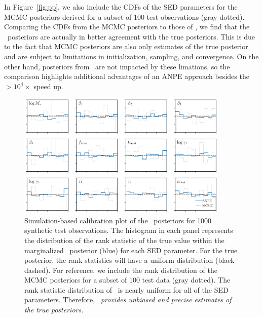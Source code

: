 In Figure~\ref{fig:pp}, we also include the CDFs of the SED parameters for the
MCMC posteriors derived for a subset of 100 test observations (gray dotted). 
Comparing the CDFs from the MCMC posteriors to those of \sedflow, we find that
the \sedflow~posteriors are actually in better agreement with the true
posteriors. 
This is due to the fact that MCMC posteriors are also only estimates of the
true posterior and are subject to limitations in initialization, sampling, and
convergence.
On the other hand, posteriors from \sedflow~are not impacted by these
limations, so the comparison highlights additional advantages of an ANPE
approach besides the ${>}10^4\times$ speed up.

\begin{figure}
\begin{center}
    \includegraphics[width=0.9\textwidth]{figs/sbc.pdf}
    \caption{\label{fig:sbc}
    Simulation-based calibration plot of the \sedflow~posteriors for 1000
    synthetic test observations. 
    The histogram in each panel represents the distribution of the rank
    statistic of the true value within the marginalized \sedflow~posterior
    (blue) for each SED parameter.
    For the true posterior, the rank statistics will have a uniform
    distribution (black dashed). 
    For reference, we include the rank distribution of the MCMC posteriors for
    a subset of 100 test data (gray dotted). 
    The rank statistic distribution of \sedflow~is nearly uniform for all of
    the SED parameters. 
    Therefore, \emph{\sedflow~provides unbiased and precise estimates of the
    true posteriors.}
    }
\end{center}
\end{figure}

